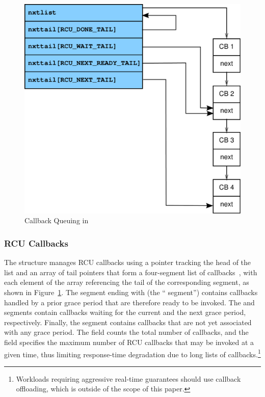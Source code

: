 \begin{figure}[tbp]
\centering
\includegraphics[scale=0.25]{rcu_data_callbacks.pdf}
\caption{Callback Queuing in }
\label{fig:rcu_data_callbacks}
\end{figure}

\subsubsection{RCU Callbacks}
The  structure manages RCU callbacks using a 
pointer tracking the head of the list and an array of 
tail pointers that form a four-segment list of
callbacks~\cite{LaiJiangshan2008NewClassicAlgorithm}, with
each element of the  array referencing the tail of the
corresponding segment, as shown in Figure~\ref{fig:rcu_data_callbacks}.
The segment ending with  (the ``
segment'') contains callbacks
handled by a prior grace period that are therefore ready to be invoked.
The  and  segments 
contain callbacks waiting for the
current and the next grace period, respectively.
Finally, the  segment contains
callbacks that are not yet associated with any grace period.
%
The  field counts the total number of callbacks, and
the  field specifies the maximum number of RCU callbacks
that may be invoked at a given time, thus limiting response-time
degradation due to long lists of callbacks.\footnote{
	Workloads requiring aggressive real-time guarantees should use
	callback offloading, which is outside of the scope of this paper.}

